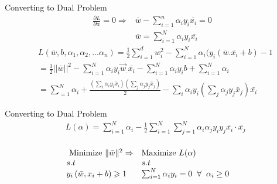 \documentclass{beamer}
\begin{document}
\begin{frame}{Converting to Dual Problem}
\begin{align*}
\frac{\partial L}{\partial w} = 0 \Rightarrow & \bar{w} - \sum_{i=1}^{n}\alpha_{i}y_{i}\bar{x_{i}} = 0\\
& \bar{w} = \sum_{i=1}^{N}\alpha_{i}y_{i}\bar{x_{i}}
\end{align*}
\begin{align*}
&L(\bar{w},b,\alpha_{1},\alpha_{2},...\alpha_{n}) = \frac{1}{2}
\sum_{i = 1}^{d} w_{i}^{2} - \sum_{i=1}^{N} \alpha_{i}(y_{i}(\bar{w}.\bar{x_i} + b) -1\\
&= \frac{1}{2}||\bar{w}||^{2}-\sum_{i=1}^{N} \alpha_{i} y_{i} \vec{w}_{.} \bar{x_{i}}-\sum_{i=1}^{N} \alpha_{i} y_{i} b+\sum_{i=1}^{N} \alpha_{i}\\
&= \sum_{=1}^{N} \alpha_{i}+\frac{\left(\sum_{i} \alpha_{i} y_{i} \bar{x}_{i}\right)\left(\sum_{j} \alpha_{j} y_{j} \bar{x}_{j}\right)}{2}-\sum_{i} \alpha_{i} y_{i}\left(\sum_{j} \alpha_{j} y_{j} \bar{x}_{j}\right) \bar{x_{i}}
\end{align*}
\end{frame}

\begin{frame}{Converting to Dual Problem}
\begin{align*}
&L(\alpha)=\sum_{i=1}^{N} \alpha_{i}-\frac{1}{2} \sum_{i=1}^{N} \sum_{j=1}^{N} \alpha_{i} \alpha_{j} y_{i} y_{j} \bar{x_{i}} \cdot \bar{x_{j}}\\
\end{align*}
\begin{tcolorbox}
\begin{align*}
&\begin{array}{ll}
{\text { Minimize }\|\bar{w}\|^{2} \Rightarrow}&{\text{Maximize } L(\alpha)} \\
{  s.t  } & {  s.t  } \\
{y_{i}\left(\bar{w}, x_{i}+b\right) \geqslant 1} & {\sum_{i=1}^{N} \alpha_{i} y_{i}=0 \hspace{2mm}\forall \hspace{2mm} \alpha_{i}  \geq 0}
\end{array}
\end{align*}
\end{tcolorbox}
\end{frame}
\end{document}
